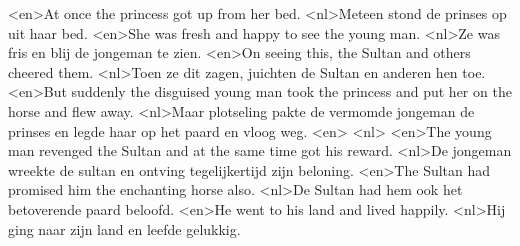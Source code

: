 <en>At once the princess got up from her bed.
<nl>Meteen stond de prinses op uit haar bed.
<en>She was fresh and happy to see the young man.
<nl>Ze was fris en blij de jongeman te zien.
<en>On seeing this, the Sultan and others cheered them.
<nl>Toen ze dit zagen, juichten de Sultan en anderen hen toe.
<en>But suddenly the disguised young man took the princess and put her on the horse and flew away.
<nl>Maar plotseling pakte de vermomde jongeman de prinses en legde haar op het paard en vloog weg.
<en>
<nl>
<en>The young man revenged the Sultan and at the same time got his reward.
<nl>De jongeman wreekte de sultan en ontving tegelijkertijd zijn beloning.
<en>The Sultan had promised him the enchanting horse also.
<nl>De Sultan had hem ook het betoverende paard beloofd.
<en>He went to his land and lived happily.
<nl>Hij ging naar zijn land en leefde gelukkig.
